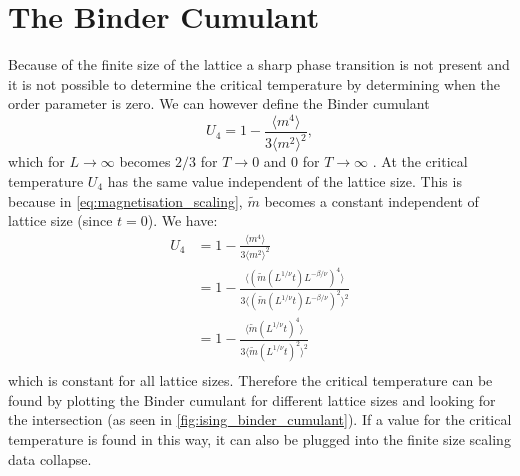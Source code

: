 \documentclass[11pt, a4paper]{report} %
\begin{document}
\section{The Binder Cumulant}
Because of the finite size of the lattice a sharp phase transition is not present and it is not possible to determine the critical temperature by determining when the order parameter is zero.
We can however define the Binder cumulant \cite{binder:1981b}
\begin{equation}
	U_4 = 1 - \frac{\langle m^4 \rangle}{3 \langle m^2 \rangle^2},
\end{equation}
which for \(L \to \infty\) becomes \(2/3\) for \(T \to 0\) and 0 for \(T \to \infty\) \cite{landau:2015}.
At the critical temperature \(U_4\) has the same value independent of the lattice size.
This is because in \cref{eq:magnetisation_scaling}, \(\widetilde{m}\) becomes a constant independent of lattice size (since \(t=0\)).
We have: \cite{corboz}
\begin{align}
	U_4 &= 1 - \frac{\langle m^4 \rangle}{3 \langle m^2 \rangle^2}\\
	&=1 - \frac{\langle \left(\widetilde{m}(L^{1/\nu}t) L^{-\beta/\nu}\right)^4 \rangle}{3 \langle \left(\widetilde{m}(L^{1/\nu}t) L^{-\beta/\nu}\right)^2 \rangle^2} \\
	&= 1 - \frac{\langle \widetilde{m}(L^{1/\nu}t) ^4 \rangle}{3 \langle \widetilde{m}(L^{1/\nu}t)^2 \rangle^2} \\
\end{align}
which is constant for all lattice sizes.
Therefore the critical temperature can be found by plotting the Binder cumulant for different lattice sizes and looking for the intersection (as seen in \cref{fig:ising_binder_cumulant}).
If a value for the critical temperature is found in this way, it can also be plugged into the finite size scaling data collapse.
\end{document}
